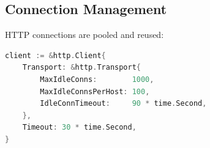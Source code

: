 \subsection{Connection Management}

HTTP connections are pooled and reused:

\begin{lstlisting}[language=Go, caption=HTTP Client Configuration]
client := &http.Client{
    Transport: &http.Transport{
        MaxIdleConns:        1000,
        MaxIdleConnsPerHost: 100,
        IdleConnTimeout:     90 * time.Second,
    },
    Timeout: 30 * time.Second,
}
\end{lstlisting}

